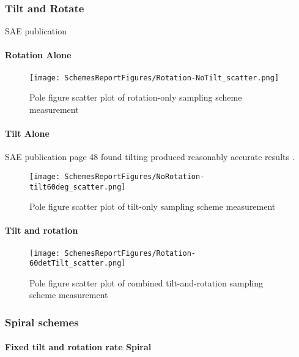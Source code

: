 \documentclass{article}
\begin{document}
\subsubsection{Tilt and Rotate}

SAE publication \citep{jatczak_sae_1980} 

\paragraph{Rotation Alone}
\begin{figure}[ht]
    \centering
    \texttt{[image: SchemesReportFigures/Rotation-NoTilt\_scatter.png]}
    \caption{Pole figure scatter plot of rotation-only sampling scheme measurement}
\end{figure}

\paragraph{Tilt Alone}

SAE publication page 48 found tilting produced reasonably accurate results \cite{jatczak_sae_1980}.

\begin{figure}[ht]
    \centering
    \texttt{[image: SchemesReportFigures/NoRotation-tilt60deg\_scatter.png]}
    \caption{Pole figure scatter plot of tilt-only sampling scheme measurement}
\end{figure}


\paragraph{Tilt and rotation}
\begin{figure}[ht]
    \centering
    \texttt{[image: SchemesReportFigures/Rotation-60detTilt\_scatter.png]}
    \caption{Pole figure scatter plot of combined tilt-and-rotation sampling scheme measurement}
\end{figure}



\subsubsection{Spiral schemes}


\paragraph{Fixed tilt and rotation rate Spiral} 
\end{document}
